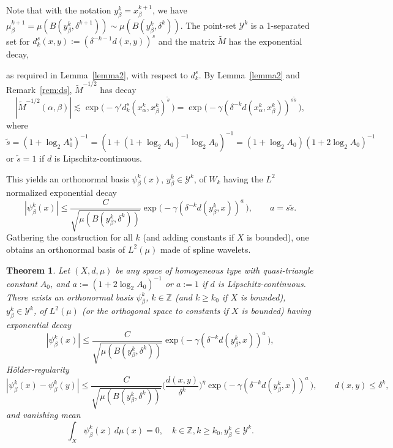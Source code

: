 \documentclass{amsart}
\numberwithin{equation}{section}
\theoremstyle{plain}
\newtheorem{theorem}[equation]{Theorem}
\theoremstyle{definition}
\theoremstyle{remark}
\begin{document}
{{Note that with the notation $y^k_{\beta}=x^{k+1}_{\beta}$, we have $\mu^{k+1}_{\beta}=\mu(B(y^k_{\beta},\delta^{k+1}))\sim \mu(B(y^k_{\beta},\delta ^k))$. 
The point-set $\mathscr{Y}^k$ is a 1-separated set for $d_{k}^s (x,y):=({\delta ^{-k-1}}{d(x, y)})^s$ and the matrix $\tilde{M}$ has the exponential decay, {as required in Lemma~\ref{lemma2}, with respect to $d_{k}^s$. By Lemma~\ref{lemma2} and Remark~\ref{rem:ds}, $\tilde{M}^{-1/2}$ has decay
\begin{equation*}
  {|{\tilde{M}^{-1/2}(\alpha,\beta)}|}
  \lesssim\exp\big(-\gamma' d_k^s(x^k_{\alpha},x^k_{\beta})^{\tilde s}\,\big)=\exp\big(-\gamma(\delta^{-k} d(x^k_{\alpha},x^k_{\beta}))^{s\tilde{s}}\,\big),
\end{equation*}
where $\tilde{s}=(1+\log_2 A_0^s)^{-1}=(1+(1+\log_2 A_0)^{-1}\log_2 A_0)^{-1}=(1+\log_2 A_0)(1+2\log_{2} A_{0})^{-1}$ or $\tilde s=1$ if $d$ is Lipschitz-continuous.

This yields an orthonormal basis $\psi^k_{\beta}(x)$, $y^k_{\beta}\in\mathscr{Y}^k$, of $W_{k}$ having  the $L^2$ normalized   exponential decay 
\begin{equation*}
  |\psi^k_{\beta}(x)|\le \frac{C}{\sqrt{ \mu(B(y^k_{\beta},\delta ^k))}} \exp\big( -\gamma (\delta^{-k}{d(y^{k}_{\beta},x)})^{a}\,\big), \qquad
   a={ s\tilde{s}}.
\end{equation*}
  Gathering the construction for all $k$ (and adding constants if $X$ is bounded), one obtains an orthonormal basis of $L^2(\mu)$ made of spline wavelets. 
 
 \begin{theorem}\label{th:wavelets} Let $(X,d,\mu)$ be any space of homogeneous type with quasi-triangle constant $A_0$, and $a:=(1+2\log_2 A_0)^{-1}$ or $a:=1$ if $d$ is Lipschitz-continuous.
There exists an orthonormal basis $\psi^k_{\beta}$, $k\in {\mathbb{Z}}$ (and $k\ge k_{0}$ if $X$ is bounded), $y^k_{\beta}\in\mathscr{Y}^k$,  of $L^2(\mu)$  (or the orthogonal space to constants  if $X$ is bounded)  having exponential decay
 \begin{equation*}
  {|{\psi^k_{\beta}(x)}|}\leq \frac{C}{\sqrt{ \mu(B(y^k_{\beta},\delta ^k))}} \exp\big( -\gamma (\delta^{-k}{d(y^{k}_{\beta},x)})^{a}\, \big)
,
\end{equation*}
H\"older-regularity
\begin{equation*}
  {|{\psi^k_{\beta}(x)-\psi^k_{\beta}(y)}|}\leq \frac{C}{\sqrt{ \mu(B(y^k_{\beta},\delta ^k))}}
    \Big(\frac{d(x,y)}{\delta^k}\Big)^{\eta} \exp\big( -\gamma (\delta^{-k}{d(y^{k}_{\beta},x)})^{a}\, \big)
,\qquad
    d(x,y)\leq\delta^k,
\end{equation*}
 and vanishing mean
 \begin{equation*}
 \int_{X} \psi^k_{\beta}(x)\, d\mu(x)=0, \quad k\in {\mathbb{Z}}, k \ge k_{0}, y^k_{\beta}\in\mathscr{Y}^k.
\end{equation*}
  \end{theorem} 
 
}}}
\end{document}
